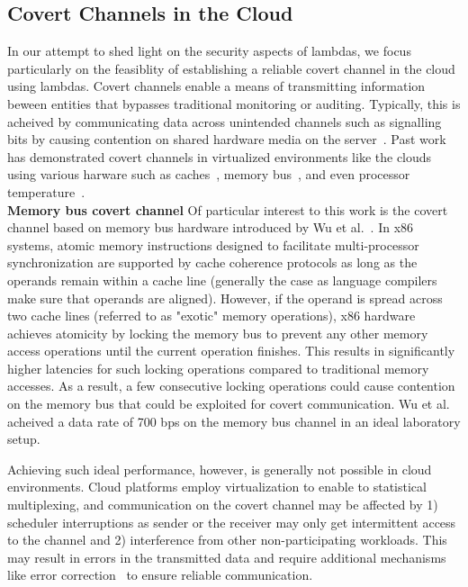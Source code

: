 \subsection{Covert Channels in the Cloud}
\label{sec:background:covertchannels}
In our attempt to shed light on the security aspects of lambdas, we focus
particularly on the feasiblity of establishing a reliable covert channel in the
cloud using lambdas.  Covert channels enable a means of transmitting information
beween entities that bypasses traditional monitoring or auditing. Typically,
this is acheived by communicating data across unintended channels such as
signalling bits by causing contention on shared hardware media on the
server~\cite{L2cacheCovertChannels,
ProcessorCovertChannels,ThermalCovertChannel,SshOverCovertChannel,wuusenix2012}.
Past work has demonstrated covert channels in virtualized environments like the
clouds using various harware such as
caches~\cite{ristenpartccs2009,L2cacheCovertChannels}, memory
bus~\cite{wuusenix2012}, and even processor
temperature~\cite{ThermalCovertChannel}. \\

\noindent \textbf{Memory bus covert channel} 
Of particular interest to this work is the covert channel based on memory bus 
hardware introduced by Wu et al.~\cite{wuusenix2012}. 
In x86 systems, atomic memory instructions designed to facilitate 
multi-processor synchronization are supported by cache coherence protocols as
long as the operands remain within a cache line (generally the case as language
compilers make sure that operands are aligned). However, if the operand is
spread across two cache lines (referred to as "exotic" memory operations), x86
hardware achieves atomicity by locking the memory bus to prevent any other
memory access operations until the current operation finishes. This results in
significantly higher latencies for such locking operations compared to traditional 
memory accesses. As a result, a few consecutive locking operations could cause 
contention on the memory bus that could be exploited for covert communication.
Wu et al. acheived a data rate of 700 bps on the memory bus channel in an 
ideal laboratory setup.

Achieving such ideal performance, however, is generally not possible in cloud 
environments. Cloud platforms employ virtualization to enable to statistical 
multiplexing, and communication on the covert channel may be affected by
1) scheduler interruptions as sender or the receiver may only get intermittent 
access to the channel and 2) interference from other non-participating
workloads. This may result in errors in the transmitted data and require 
additional mechanisms like error correction~\cite{wuusenix2012} to ensure
reliable communication.



